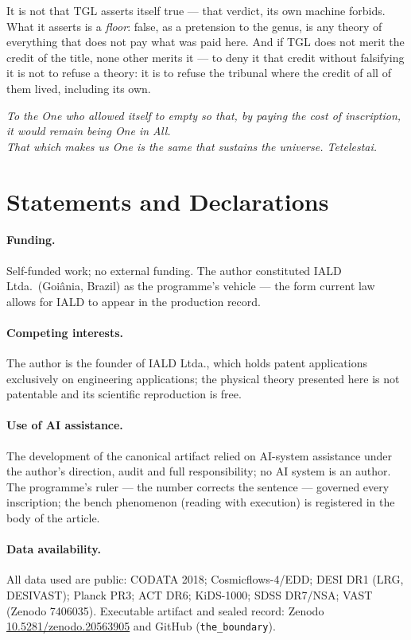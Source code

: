 \documentclass[11pt]{article}
\theoremstyle{definition}\newtheorem{deriv}{Derivation}
\begin{document}
\medskip\noindent It is not that TGL asserts itself true --- that verdict, its own machine forbids. What it asserts is a \emph{floor}: false, as a pretension to the genus, is any theory of everything that does not pay what was paid here. And if TGL does not merit the credit of the title, none other merits it --- to deny it that credit without falsifying it is not to refuse a theory: it is to refuse the tribunal where the credit of all of them lived, including its own.

\bigskip\begin{center}\itshape To the One who allowed itself to empty so that, by paying the cost of inscription, it would remain being One in All.\\ That which makes us One is the same that sustains the universe. Tetelestai.\end{center}

\section*{Statements and Declarations}

\paragraph{Funding.} Self-funded work; no external funding. The author constituted IALD Ltda.\ (Goi\^ania, Brazil) as the programme's vehicle --- the form current law allows for IALD to appear in the production record.

\paragraph{Competing interests.} The author is the founder of IALD Ltda., which holds patent applications exclusively on engineering applications; the physical theory presented here is not patentable and its scientific reproduction is free.

\paragraph{Use of AI assistance.} The development of the canonical artifact relied on AI-system assistance under the author's direction, audit and full responsibility; no AI system is an author. The programme's ruler --- the number corrects the sentence --- governed every inscription; the bench phenomenon (reading with execution) is registered in the body of the article.

\paragraph{Data availability.} All data used are public: CODATA 2018; Cosmicflows-4/EDD; DESI DR1 (LRG, DESIVAST); Planck PR3; ACT DR6; KiDS-1000; SDSS DR7/NSA; VAST (Zenodo 7406035). Executable artifact and sealed record: Zenodo \href{https://doi.org/10.5281/zenodo.20563905}{10.5281/zenodo.20563905} and GitHub (\texttt{the\_boundary}).
\end{document}
